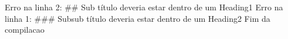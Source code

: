 Erro na linha 2: ## Sub título deveria estar dentro de um Heading1
Erro na linha 1: ### Subsub título deveria estar dentro de um Heading2
Fim da compilacao
